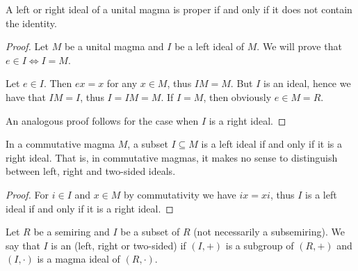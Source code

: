 \begin{proposition}\label{thm:proper_ideals_containing_identity}
  A left or right ideal of a unital magma is proper if and only if it does not contain the identity.
\end{proposition}
\begin{proof}
  Let \( M \) be a unital magma and \( I \) be a left ideal of \( M \). We will prove that \( e \in I \iff I = M \).

  \begin{description}
    \Implies Let \( e \in I \). Then \( ex = x \) for any \( x \in M \), thus \( IM = M \). But \( I \) is an ideal, hence we have that \( IM = I \), thus \( I = IM = M \).
    \ImpliedBy If \( I = M \), then obviously \( e \in M = R \).
  \end{description}

  An analogous proof follows for the case when \( I \) is a right ideal.
\end{proof}

\begin{proposition}\label{thm:commutative_magma_ideals}
  In a commutative magma \( M \), a subset \( I \subseteq M \) is a left ideal if and only if it is a right ideal. That is, in commutative magmas, it makes no sense to distinguish between left, right and two-sided ideals.
\end{proposition}
\begin{proof}
  For \( i \in I \) and \( x \in M \) by commutativity we have \( ix = xi \), thus \( I \) is a left ideal if and only if it is a right ideal.
\end{proof}

\begin{definition}\label{def:semiring_ideal}
  Let \( R \) be a semiring and \( I \) be a subset of \( R \) (not necessarily a subsemiring). We say that \( I \) is an  (left, right or two-sided) if \( (I, +) \) is a subgroup of \( (R, +) \) and \( (I, \cdot) \) is a magma ideal of \( (R, \cdot) \).
\end{definition}

